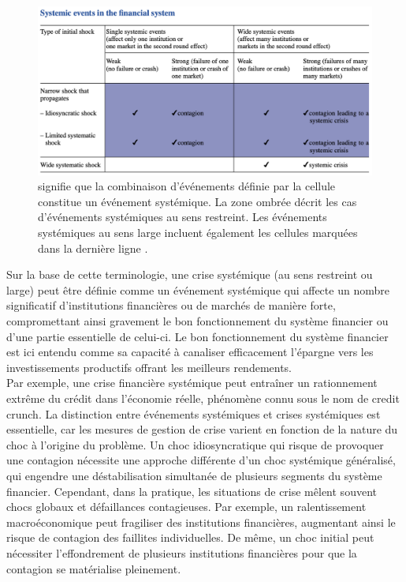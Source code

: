 \begin{figure}
    \centering
    \includegraphics[width=1.0\linewidth]{images/systemic_events.png}
    \caption{\justifying {} signifie que la combinaison d’événements définie par la cellule constitue un événement systémique. La zone ombrée décrit les cas d’événements systémiques au sens restreint.
Les événements systémiques au sens large incluent également les cellules marquées  dans la dernière ligne \citep{debandt2000systemic}.}
    \label{fig:systemic_vents}
\end{figure}

Sur la base de cette terminologie, une crise systémique (au sens restreint ou large) peut être définie comme un événement systémique qui affecte un nombre significatif d’institutions financières ou de marchés de manière forte, compromettant ainsi gravement le bon fonctionnement du système financier ou d’une partie essentielle de celui-ci. Le bon fonctionnement du système financier est ici entendu comme sa capacité à canaliser efficacement l’épargne vers les investissements productifs offrant les meilleurs rendements.\\

Par exemple, une crise financière systémique peut entraîner un rationnement extrême du crédit dans l’économie réelle, phénomène connu sous le nom de credit crunch. La distinction entre événements systémiques et crises systémiques est essentielle, car les mesures de gestion de crise varient en fonction de la nature du choc à l’origine du problème. Un choc idiosyncratique qui risque de provoquer une contagion nécessite une approche différente d’un choc systémique généralisé, qui engendre une déstabilisation simultanée de plusieurs segments du système financier. Cependant, dans la pratique, les situations de crise mêlent souvent chocs globaux et défaillances contagieuses. Par exemple, un ralentissement macroéconomique peut fragiliser des institutions financières, augmentant ainsi le risque de contagion des faillites individuelles. De même, un choc initial peut nécessiter l’effondrement de plusieurs institutions financières pour que la contagion se matérialise pleinement.

